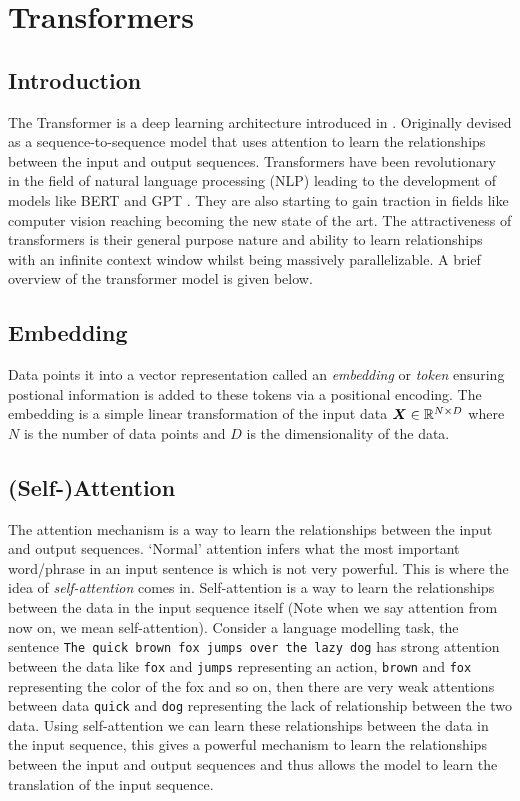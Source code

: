 \documentclass[../../main.tex]{subfiles}
\begin{document}
\section{Transformers}
\subsection{Introduction}

The Transformer is a deep learning architecture introduced in \cite{vaswani2017attention}. Originally devised as a sequence-to-sequence model that uses attention to learn the relationships between the input and output sequences. Transformers have been revolutionary in the field of natural language processing (NLP) leading to the development of models like BERT \cite{devlin2019bert} and GPT \cite{brown2020language}. They are also starting to gain traction in fields like computer vision \cite{dosovitskiy2021image} reaching becoming the new state of the art. The attractiveness of transformers is their general purpose nature and ability to learn relationships with an infinite context window whilst being massively parallelizable. A brief overview of the transformer model is given below.


\subsection{Embedding}

Data points it into a vector representation called an \emph{embedding} or \emph{token} ensuring postional information is added to these tokens via a positional encoding. The embedding is a simple linear transformation of the input data $\bm{X} \in \mathbb{R}^{N \times D}$ where $N$ is the number of data points and $D$ is the dimensionality of the data. 

\subsection{(Self-)Attention}

The attention mechanism is a way to learn the relationships between the input and output sequences. `Normal' attention infers what the most important word/phrase in an input sentence is which is not very powerful. This is where the idea of \emph{self-attention} comes in. Self-attention is a way to learn the relationships between the data in the input sequence itself (Note when we say attention from now on, we mean self-attention).  Consider a language modelling task, the sentence \texttt{The quick brown fox jumps over the lazy dog} has strong attention between the data like \texttt{fox} and \texttt{jumps} representing an action, \texttt{brown} and \texttt{fox} representing the color of the fox and so on, then there are very weak attentions between data \texttt{quick} and \texttt{dog} representing the lack of relationship between the two data. Using self-attention we can learn these relationships between the data in the input sequence, this gives a powerful mechanism to learn the relationships between the input and output sequences and thus allows the model to learn the translation of the input sequence.
\end{document}
